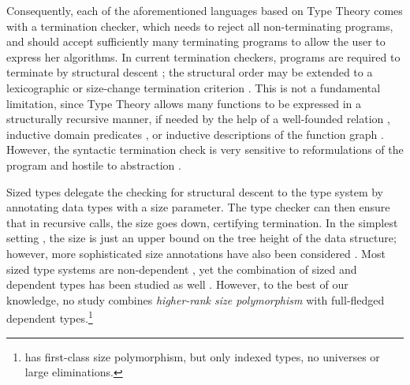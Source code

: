 \documentclass[acmlarge,review,anonymous]{acmart}\settopmatter{printfolios=true}
\begin{document}
Consequently, each of the aforementioned languages based on Type Theory comes with a termination checker, which needs to reject all non-terminating programs, and should accept sufficiently many terminating programs to allow the user to express her algorithms.  In current termination checkers, programs are required to terminate by structural descent \cite{gimenez:guardeddefinitions}; the structural order may be extended to a lexicographic \cite{abelAltenkirch:jfp02} or size-change termination criterion \cite{jones:sizeChange,wahlstedt:PhD}.  This is not a fundamental limitation, since Type Theory allows many functions to be expressed in a structurally recursive manner, if needed by the help of a well-founded relation \cite{nordstrom:genrec}, inductive domain predicates \cite{boveCapretta:mscs05}, or inductive descriptions of the function graph \cite{bove:entcs09}.  However, the syntactic termination check is very sensitive to reformulations of the program and hostile to abstraction \cite{abel:fics12}.

Sized types \cite{hughesParetoSabry:popl96} delegate the checking for structural descent to the type system by annotating data types with a size parameter.  The type checker can then ensure that in recursive calls, the size goes down, certifying termination.  In the simplest setting \cite{gimenez:typeBased,abel:lmcs07}, the size is just an upper bound on the tree height of the data structure; however, more sophisticated size annotations have also been considered \cite{xi:terminationHOSC,blanqui:rta04}.  Most sized type systems are non-dependent \cite{amadio:guardcondition,abelPientka:jfp16,bartheGregoireRiba:lernet08,bartheGregoireRiba:csl08,blanquiRiba:lpar06,dalLagoGrellois:probabilisticSizedTypes2017}, yet the combination of sized and dependent types has been studied as well \cite{blanqui:csl05,bartheGregoirePastawski:lpar06,gregoireSacchini:lpar10,sacchini:lics13,sacchini:flops14}.  However, to the best of our knowledge, no study combines \emph{higher-rank size polymorphism} with full-fledged dependent types.\footnote{\citet{xi:terminationHOSC} has first-class size polymorphism, but only indexed types, no universes or large eliminations.}
\end{document}
